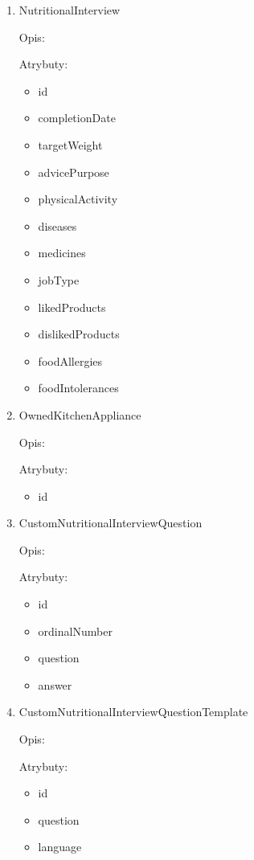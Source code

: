 \begin{enumerate}[label={\textbf{KAT/\protect\threedigits{\theenumi}}}, wide, labelwidth=!, labelindent=0pt]
    \item \label{kat:NutritionalInterview} NutritionalInterview

    Opis: \lipsum[1]
    \par
    Atrybuty:
    \begin{itemize}
        \item id
        \item completionDate
        \item targetWeight
        \item advicePurpose
        \item physicalActivity
        \item diseases
        \item medicines
        \item jobType
        \item likedProducts
        \item dislikedProducts
        \item foodAllergies
        \item foodIntolerances
    \end{itemize}

    \item \label{kat:OwnedKitchenAppliance} OwnedKitchenAppliance

    Opis: \lipsum[1]
    \par
    Atrybuty:
    \begin{itemize}
        \item id
    \end{itemize}

    \item \label{kat:CustomNutritionalInterviewQuestion} CustomNutritionalInterviewQuestion

    Opis: \lipsum[1]
    \par
    Atrybuty:
    \begin{itemize}
        \item id
        \item ordinalNumber
        \item question
        \item answer
    \end{itemize}

    \item \label{kat:CustomNutritionalInterviewQuestionTemplate} CustomNutritionalInterviewQuestionTemplate

    Opis: \lipsum[1]
    \par
    Atrybuty:
    \begin{itemize}
        \item id
        \item question
        \item language
    \end{itemize}


\end{enumerate}
